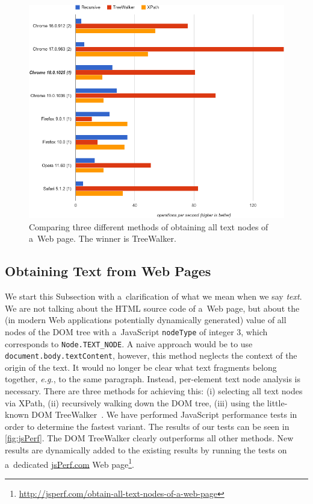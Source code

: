 \documentclass{acm_proc_article-sp}
\let\oldemph\emph
\renewcommand{\emph}[1]{\oldemph{\fontsize{9}{9}\selectfont #1}}
\newcommand{\inlinelistingsize}{\fontsize{8pt}{11pt}}
\let\oldurl\url
\renewcommand{\url}[1]{\inlinelistingsize\oldurl{#1}}
\begin{document}
\begin{figure}[t!]
\begin{center}
   \includegraphics[width=1\linewidth]{./jsPerf.png}
\end{center}
   \caption{Comparing three different methods of obtaining all text nodes of a~Web page. The winner is TreeWalker.}
\label{fig:jsPerf}
\end{figure}

\subsection{Obtaining Text from Web Pages}
We start this Subsection with a~clarification of what we mean when we say \emph{text}.
We are not talking about the HTML source code of a~Web page,
but about the (in modern Web applications potentially dynamically generated) value of all nodes
of the DOM tree with a~JavaScript \texttt{nodeType} of integer $3$,
which corresponds to \texttt{Node.TEXT\_NODE}.
A naive approach would be to use \texttt{document.body.textContent}, however,
this method neglects the context of the origin of the text.
It would no longer be clear what text fragments belong together, \emph{e.g.}, to the same paragraph.
Instead, per-element text node analysis is necessary.
There are three methods for achieving this:
(i) selecting all text nodes via XPath,
(ii) recursively walking down the DOM tree,
(iii) using the little-known DOM TreeWalker~\cite{treewalker}.
We have performed JavaScript performance tests in order to determine the fastest variant.
The results of our tests can be seen in \autoref{fig:jsPerf}.
The DOM TreeWalker clearly outperforms all other methods.
New results are dynamically added to the existing results by running the tests on a~dedicated \url{jsPerf.com} Web page\footnote{\url{http://jsperf.com/obtain-all-text-nodes-of-a-web-page}}.
\end{document}
